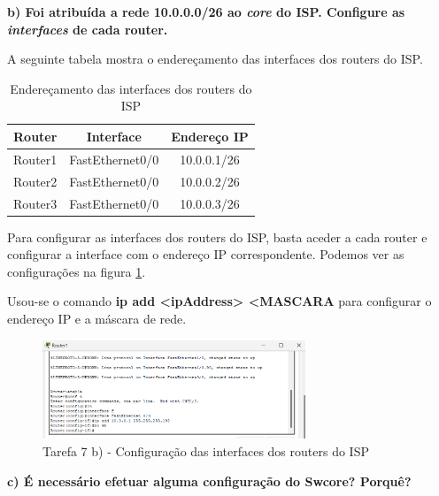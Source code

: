 \documentclass[11pt,english, openright, oneside]{book}
\begin{document}
\vspace{0.8cm}

\textbf{b) Foi atribuída a rede 10.0.0.0/26 ao \textit{core} do ISP. Configure as \textit{interfaces} de cada router.}
\vspace{0.2cm}

A seguinte tabela mostra o endereçamento das interfaces dos routers do ISP.

\newpage
\begin{table}[h!]
    \centering
    \begin{tabular}{|c|c|c|}
    \hline
        \textbf{Router} & \textbf{Interface} & \textbf{Endereço IP}\\
    \hline
        Router1 & FastEthernet0/0 & 10.0.0.1/26 \\
        Router2 & FastEthernet0/0 & 10.0.0.2/26 \\
        Router3 & FastEthernet0/0 & 10.0.0.3/26 \\
    \hline
    \end{tabular}
    \caption{Endereçamento das interfaces dos routers do ISP}
    \label{tab:ipISP}
\end{table}
\vspace{0.2cm}

Para configurar as interfaces dos routers do ISP, basta aceder a cada router e configurar a interface com o endereço IP correspondente. Podemos ver as configurações na figura \ref{fig:7.b}.
\par Usou-se o comando \textbf{ip add <ipAddress> <MASCARA} para configurar o endereço IP e a máscara de rede.
\vspace{0.2cm}

\begin{figure}[H]
    \centering
    \includegraphics[width=0.7\textwidth]{imagens/Tarefa7/7.b.png}
    \caption{Tarefa 7 b) - Configuração das interfaces dos routers do ISP}
    \label{fig:7.b}
\end{figure}


\vspace{0.8cm}

\textbf{c) É necessário efetuar alguma configuração do Swcore? Porquê?}
\vspace{0.2cm}
\end{document}

